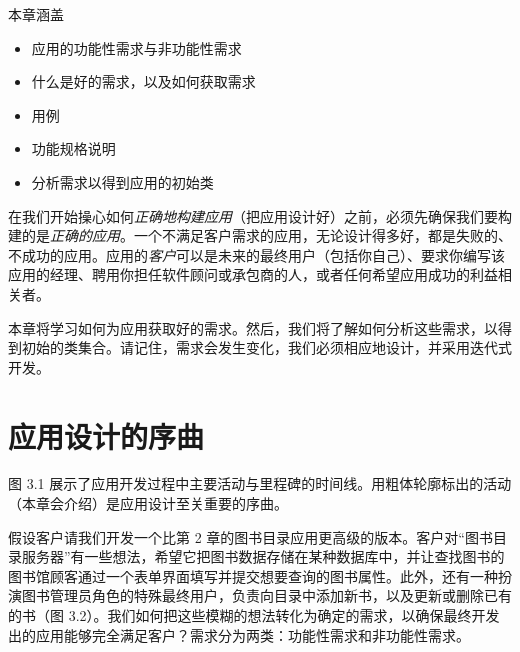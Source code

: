 \begin{myChapterIntro}{本章涵盖}
\begin{itemize}
\item 应用的功能性需求与非功能性需求
\item 什么是好的需求，以及如何获取需求
\item 用例
\item 功能规格说明
\item 分析需求以得到应用的初始类
\end{itemize}
\end{myChapterIntro}

在我们开始操心如何\emph{正确地构建应用}（把应用设计好）之前，必须先确保我们要构建的是\emph{正确的应用}。一个不满足客户需求的应用，无论设计得多好，都是失败的、不成功的应用。应用的\emph{客户}可以是未来的最终用户（包括你自己）、要求你编写该应用的经理、聘用你担任软件顾问或承包商的人，或者任何希望应用成功的利益相关者。


本章将学习如何为应用获取好的需求。然后，我们将了解如何分析这些需求，以得到初始的类集合。请记住，需求会发生变化，我们必须相应地设计，并采用迭代式开发。

\section{应用设计的序曲}

图 3.1 展示了应用开发过程中主要活动与里程碑的时间线。用粗体轮廓标出的活动（本章会介绍）是应用设计至关重要的序曲。


假设客户请我们开发一个比第 2 章的图书目录应用更高级的版本。客户对“图书目录服务器”有一些想法，希望它把图书数据存储在某种数据库中，并让查找图书的图书馆顾客通过一个表单界面填写并提交想要查询的图书属性。此外，还有一种扮演图书管理员角色的特殊最终用户，负责向目录中添加新书，以及更新或删除已有的书（图 3.2）。我们如何把这些模糊的想法转化为确定的需求，以确保最终开发出的应用能够完全满足客户？需求分为两类：功能性需求和非功能性需求。


